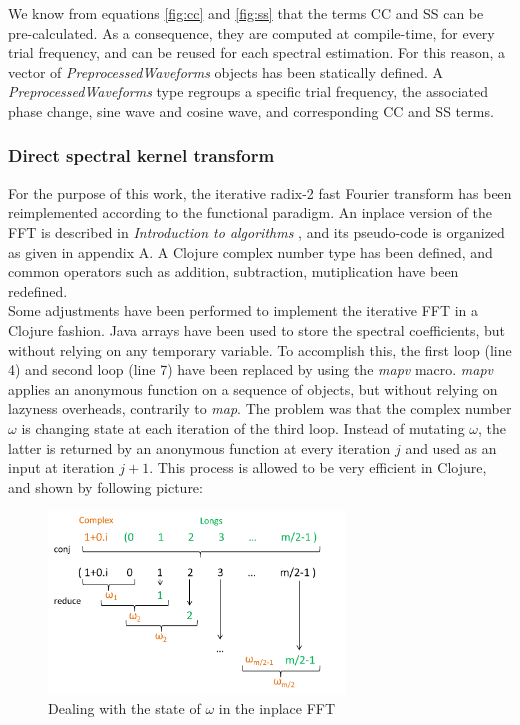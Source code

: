 \documentclass[letterpaper]{article}
\begin{document}
We know from equations \ref{fig:cc} and \ref{fig:ss} that the terms CC and SS can be pre-calculated. As a consequence, they are computed at compile-time,
for every trial frequency, and can be reused for each spectral estimation. For this reason, a vector of \textit{PreprocessedWaveforms} objects has been statically defined. A \textit{PreprocessedWaveforms}
type regroups a specific trial frequency, the associated phase change, sine wave and cosine wave, and corresponding CC and SS terms.\\

\subsubsection{Direct spectral kernel transform}

For the purpose of this work, the iterative radix-2 fast Fourier transform has been reimplemented according to the functional paradigm. An inplace version of the FFT is described in \textit{Introduction to algorithms} \citep{FFT}, and its pseudo-code is organized as given in appendix A. A Clojure complex number type has been defined, and common operators such as addition, subtraction, mutiplication have been redefined. \\

Some adjustments have been performed to implement the iterative FFT in a Clojure fashion. Java arrays have been used to store the spectral coefficients, but without relying on any temporary variable. To accomplish this, the first loop (line 4) and second loop (line 7) have been replaced by using the \textit{mapv} macro.
\textit{mapv} applies an anonymous function on a sequence of objects, but without relying on lazyness overheads, contrarily to \textit{map}.
The problem was that the complex number $\omega$ is changing state at each iteration of the third loop. Instead of mutating $\omega$, the latter is returned by an anonymous function at every iteration $j$ and used as an input at iteration $j + 1$. This process is allowed to be very efficient in Clojure, and shown by following picture:

\begin{figure}[h!]
\begin{center}
\includegraphics[width=3.1in,angle=0]{imgs/reduceconj.png}
\caption{Dealing with the state of $\omega$ in the inplace FFT}
\label{fig3}
\end{center}
\end{figure}
\end{document}
